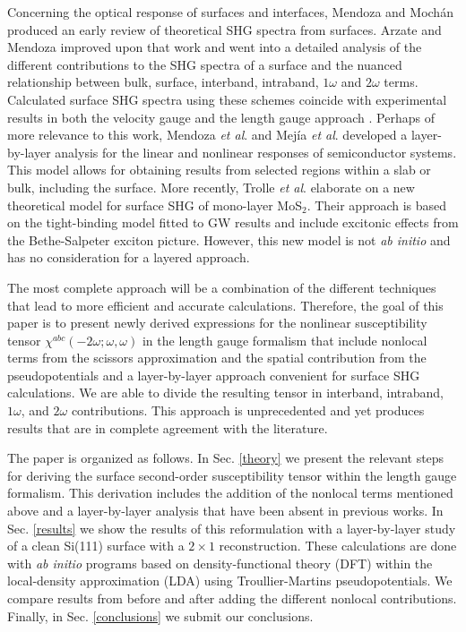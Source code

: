 \documentclass[floatfix,prb,aps,superscriptaddress,11pt,preprint,letterpaper]{revtex4}
\begin{document}
Concerning the optical response of surfaces and interfaces,
Mendoza and Moch\'an\cite{mendozaPRB96} produced an early review of 
theoretical SHG spectra from surfaces. 
Arzate and Mendoza\cite{arzatePRB01} improved upon that work and
went into a detailed analysis of the different contributions to the 
SHG spectra of a surface and the nuanced relationship between bulk, 
surface, interband, intraband, $1\omega$ and $2\omega$ terms. 
Calculated surface SHG spectra using these schemes coincide with experimental
results in both the velocity gauge
\cite{mendozaPRB01,mendozaPRL98,reiningPRB94} and the length gauge approach
\cite{sharmaPRB03}. 
Perhaps of more relevance to this work, 
Mendoza \emph{et al}.\cite{mendozaPRB06} and 
Mej\'ia \emph{et al}.\cite{mejiaRMF04} developed a layer-by-layer analysis for 
the linear and nonlinear responses of semiconductor systems. This model
allows for obtaining results from selected regions within a slab or bulk,
including the surface.
More recently, 
Trolle \emph{et al}.\cite{trollePRB14} 
elaborate on a new theoretical model for surface SHG of 
mono-layer MoS$_{2}$. Their approach is based on the tight-binding model 
fitted to GW results and include excitonic effects from the 
Bethe-Salpeter exciton picture. However, this new model is not 
\emph{ab initio} and has no consideration for a layered approach.

The most complete approach will be a combination of the different techniques 
that lead to more efficient and accurate calculations. Therefore,
the goal of this paper is to present newly derived expressions for the 
nonlinear susceptibility tensor $\chi^{abc}(-2\omega;\omega,\omega)$ 
in the length gauge formalism
that include nonlocal terms from the scissors approximation 
and the spatial contribution from the pseudopotentials and a 
layer-by-layer approach convenient for surface SHG calculations. We are
able to divide the resulting tensor in interband, intraband, $1\omega$, and 
$2\omega$ contributions. This approach is unprecedented and yet produces 
results that are in complete agreement with the literature.

The paper is organized as follows. 
In Sec. \ref{theory} we present the 
relevant steps for deriving the surface second-order susceptibility tensor 
within the length gauge formalism. This derivation includes the addition of 
the nonlocal terms mentioned above and a layer-by-layer analysis that have 
been absent in previous works. 
In Sec. \ref{results} we show the results of this 
reformulation with a layer-by-layer study of a clean Si(111) surface with a 
$2 \times 1$ reconstruction. These calculations are done with \emph{ab initio}
programs based on density-functional theory (DFT) within the local-density 
approximation (LDA) using Troullier-Martins pseudopotentials. We compare 
results from before and after adding the different nonlocal contributions.
Finally, in Sec. \ref{conclusions} we submit our conclusions.
\end{document}
